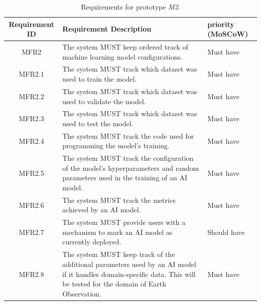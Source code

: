 \begin{table}[H]
    \centering
    \begin{tabular}{ | c | p{9cm} | p{3cm} |}
        \hline
        \textbf{Requirement ID} & \textbf{Requirement Description} & \textbf{priority (MoSCoW)} \\ \hline
        MFR2     & The system MUST keep ordered track of machine learning model configurations. & Must have \\ \hline
        MFR2.1   & The system MUST track which dataset was used to train the model. & Must have \\ \hline
        MFR2.2   & The system MUST track which dataset was used to validate the model. & Must have \\ \hline
        MFR2.3   & The system MUST track which dataset was used to test the model. & Must have \\ \hline
        MFR2.4   & The system MUST track the code used for programming the model's training. & Must have \\ \hline
        MFR2.5   & The system MUST track the configuration of the model's hyperparameters and random parameters used in the training of an AI model. & Must have \\ \hline
        MFR2.6   & The system MUST track the metrics achieved by an AI model. & Must have \\ \hline
        MFR2.7   & The system MUST provide users with a mechanism to mark an AI model as currently deployed. & Should have \\ \hline
        MFR2.8   & The system MUST keep track of the additional parameters used by an AI model if it handles domain-specific data. This will be tested for the domain of Earth Observation. & Must have \\ \hline
    \end{tabular}
    \caption{Requirements for prototype \emph{M2}.}
    \label{tab:requirementsM2}
\end{table}

